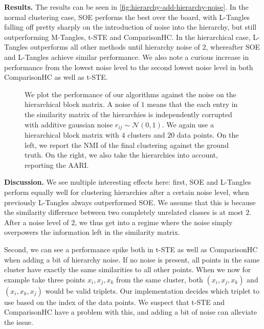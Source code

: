 \noindent
\textbf{Results.}
The results can be seen in \autoref{fig:hierarchy-add-hierarchy-noise}. In the normal clustering case, SOE performs the best over the board, with L-Tangles
falling off pretty sharply on the introduction of noise into the hierarchy, but still outperforming M-Tangles, t-STE and ComparisonHC. In the hierarchical case, L-Tangles outperforms all other methods until hierarchy noise of $2$, whereafter SOE and L-Tangles achieve similar performance. We also note a curious increase in performance from the lowest noise level to the 
second lowest noise level in both ComparisonHC as well as t-STE.


\begin{figure}[ht]
    \centering
    \caption{
        We plot the performance of our algorithms against the noise on the hierarchical block matrix. A noise of $1$ means that the each 
        entry in the similarity matrix of the hierarchies is independently corrupted with additive gaussian noise $r_{ij} \sim \mathcal{N}(0, 1)$.
        We again use a hierarchical block matrix with $4$ clusters and $20$ data points. On the left, we report the NMI of the final clustering against the ground
        truth. On the right, we also take the hierarchies into account, reporting the AARI.
    }
    \label{fig:hierarchy-add-hierarchy-noise}
\end{figure}

\noindent
\textbf{Discussion.}
We see multiple interesting effects here: first, SOE and L-Tangles perform equally well for clustering hierarchies after a certain noise level, when previously L-Tangles always outperformed
SOE. We assume that this is because the similarity difference between two completely unrelated classes is at most $2$. After a noise level 
of $2$, we thus get into a regime where the noise simply overpowers the information left in the similarity matrix.

Second, we can see a performance spike both in t-STE as well as ComparisonHC when adding a bit of hierarchy noise. If no noise is present, all points in the same cluster 
have exactly the same similarities to all other points. When we now for example take three points  $x_i, x_j, x_k$ from the same cluster, both $(x_i, x_j, x_k)$ and $(x_i, x_k, x_j)$ 
would be valid triplets. Our implementation decides which triplet to use based on the index of the data points. We suspect that t-STE and ComparisonHC have a problem with this, 
and adding a bit of noise can alleviate the issue.

